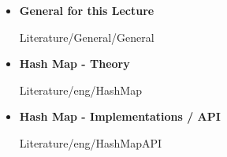 \begin{itemize}
  \item
    \textbf{General for this Lecture}
    \begin{btSect}{Literature/General/General}
      \btPrintAll
    \end{btSect}
\end{itemize}
\newpage
\begin{itemize}
  \item
    \textbf{Hash Map - Theory}
    \begin{btSect}{Literature/eng/HashMap}
      \btPrintAll
    \end{btSect}
  \item
    \textbf{Hash Map - Implementations / API}
    \begin{btSect}{Literature/eng/HashMapAPI}
      \btPrintAll
    \end{btSect}
\end{itemize}